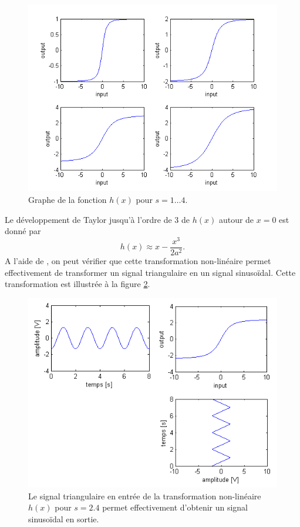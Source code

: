 \begin{figure}[ht]
	\centering
	\includegraphics[scale=0.6]{img/non-linear-transfer.png}
	\caption{Graphe de la fonction $h(x)$ pour $s=1\dots4$.}
	\label{fig:non-linear-transfer}
\end{figure}

Le développement de Taylor jusqu'à l'ordre de 3 de
$h(x)$ autour de $x=0$ est donné par 
\[ h(x) \approx x-\frac{x^3}{2a^2}. \]
A l'aide de \matlab, on peut vérifier que cette
transformation non-linéaire permet effectivement
de transformer un signal triangulaire en un signal
sinusoïdal. Cette transformation est illustrée à
la figure \ref{fig:in_out_diagram}.

\begin{figure}[ht]
	\centering
	\includegraphics[scale=0.6]{img/in_out_diagram.png}
	\caption{Le signal triangulaire en entrée de la transformation
	non-linéaire $h(x)$ pour $s=2.4$ permet effectivement d'obtenir
	un signal sinusoïdal en sortie.}
	\label{fig:in_out_diagram}
\end{figure}

